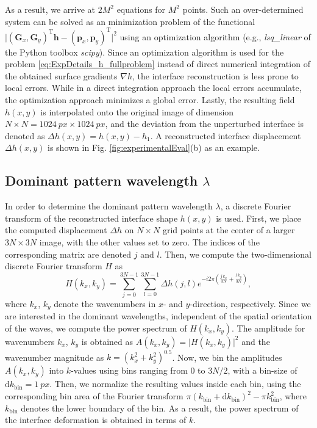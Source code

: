 \documentclass{jfm_arxiv}
\renewcommand\vec{\mathbf}
\newcommand{\matr}[1]{\bm{#1}}     %
\begin{document}
As a result, we arrive at $2M^2$ equations for $M^2$ points. Such an over-determined system can be solved as an minimization problem of the 
functional $\vert (\matr{G}_x, \matr{G}_y)^\text{T} \vec{h} - ( \vec{p}_x ,\vec{p}_y)^\text{T} \vert^2$ using an optimization algorithm (e.g., \textit{lsq\_linear} of the Python toolbox \textit{scipy}).
Since an optimization algorithm is used for the problem \eqref{eq:ExpDetails_h_fullproblem} instead of direct numerical integration of the obtained surface gradients $\nabla h$, the interface reconstruction is less prone to local errors. While in a direct integration approach the local errors accumulate, the optimization approach minimizes a global error.
Lastly, the resulting field $h(x,y)$ is interpolated onto the original image of dimension $N \times N = \SI{1024}{px} \times \SI{1024}{px}$, and the deviation from the unperturbed interface is denoted as $\Delta h(x,y) = h(x,y) - h_1$. A reconstructed interface displacement $\Delta h(x,y)$ is shown in Fig. \ref{fig:experimentalEval}(b) as an example.

\subsection{Dominant pattern wavelength $\lambda$}
In order to determine the dominant pattern wavelength $\lambda$, a discrete Fourier transform of the reconstructed interface shape $h(x,y)$ is used.
First, we place the computed displacement $\Delta h$ on $N \times N$ grid points at the center of a larger $3N \times 3N$ image, with the other values set to zero. The indices of the corresponding matrix are denoted $j$ and $l$. Then, we compute the two-dimensional discrete Fourier transform ${H}$ as
\begin{equation}
H(k_x,k_y) = \sum_{j=0}^{3N-1} \sum_{l=0}^{3N-1} \Delta h(j,l) e^{-i 2 \pi \left( \frac{j\,k_x}{3N} + \frac{l\,k_y}{3N} \right) }, 
\end{equation}
where $k_x$, $k_y$ denote the wavenumbers in $x$- and $y$-direction, respectively.
Since we are interested in the dominant wavelengths, independent of the spatial orientation of the waves, we compute the power spectrum of $H(k_x,k_y)$. The amplitude for wavenumbers $k_x$, $k_y$ is obtained as $A(k_x,k_y) = \vert H(k_x,k_y) \vert^2$ and the wavenumber magnitude as $k =  (k_x^2 +k_y^2)^{0.5}$.
Now, we bin the amplitudes $A(k_x,k_y)$ into $k$-values using bins ranging from 0 to $3N/2$, with a bin-size of $\text{d}k_\text{bin}=\SI{1}{px}$. Then, we normalize the resulting values inside each bin, using the corresponding bin area of the Fourier transform $\pi \left(k_\text{bin}+\text{d}k_\text{bin} \right)^2 - \pi  k_\text{bin}^2 $, where $k_\text{bin}$ denotes the lower boundary of the bin. As a result, the power spectrum of the interface deformation is obtained in terms of $k$.  
\end{document}
